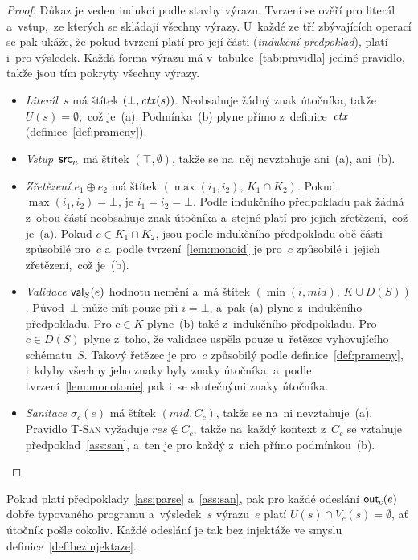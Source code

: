 \begin{proof}
Důkaz je veden indukcí podle stavby výrazu. Tvrzení se ověří pro literál a~vstup,~ze kterých se skládají všechny výrazy. U~každé ze tří zbývajících operací se pak ukáže, že pokud tvrzení platí pro její části (\emph{indukční předpoklad}), platí i~pro výsledek. Každá forma výrazu má v~tabulce~\ref{tab:pravidla} jediné pravidlo, takže jsou tím pokryty všechny výrazy.
\begin{itemize}
    \item \emph{Literál~$s$} má štítek $(\bot, \mathit{ctx}(s))$. Neobsahuje žádný znak útočníka, takže $U(s) = \emptyset$,~což je~(a). Podmínka~(b) plyne přímo z~definice~$\mathit{ctx}$ (definice~\ref{def:prameny}).
    \item \emph{Vstup~$\mathsf{src}_n$} má štítek $(\top, \emptyset)$, takže se na~něj nevztahuje ani~(a), ani~(b).
    \item \emph{Zřetězení $e_1 \oplus e_2$} má štítek $(\max(i_1,i_2),\, K_1 \cap K_2)$. Pokud $\max(i_1,i_2) = \bot$, je $i_1 = i_2 = \bot$. Podle indukčního předpokladu pak žádná z~obou částí neobsahuje znak útočníka a~stejné platí pro jejich zřetězení,~což je~(a). Pokud $c \in K_1 \cap K_2$, jsou podle indukčního předpokladu obě části způsobilé pro~$c$ a~podle tvrzení~\ref{lem:monoid} je pro~$c$ způsobilé i~jejich zřetězení,~což je~(b).
    \item \emph{Validace $\mathsf{val}_S(e)$} hodnotu nemění a~má štítek $(\min(i,\mathit{mid}),\, K \cup D(S))$. Původ~$\bot$ může mít pouze při $i = \bot$, a~pak (a) plyne z~indukčního předpokladu. Pro $c \in K$ plyne~(b) také z~indukčního předpokladu. Pro $c \in D(S)$ plyne z~toho, že validace uspěla pouze u~řetězce vyhovujícího schématu~$S$. Takový řetězec je pro~$c$ způsobilý podle definice~\ref{def:prameny}, i~kdyby všechny jeho znaky byly znaky útočníka, a~podle tvrzení~\ref{lem:monotonie} pak i~se skutečnými znaky útočníka.
    \item \emph{Sanitace $\sigma_c(e)$} má štítek $(\mathit{mid}, C_c)$, takže se na~ni nevztahuje~(a). Pravidlo \mbox{\textsc{T-San}} vyžaduje $\mathit{res} \notin C_c$, takže na~každý kontext z~$C_c$ se vztahuje předpoklad~\ref{ass:san}, a~ten je pro každý z~nich přímo podmínkou~(b).\qedhere
\end{itemize}
\end{proof}

\begin{veta}[Konfinace]
\label{thm:konfinace}
Pokud platí předpoklady~\ref{ass:parse} a~\ref{ass:san}, pak pro každé odeslání $\mathsf{out}_c(e)$ dobře typovaného programu a~výsledek~$s$ výrazu~$e$ platí $U(s) \cap V_c(s) = \emptyset$, ať útočník pošle cokoliv. Každé odeslání je tak bez injektáže ve smyslu definice~\ref{def:bezinjektaze}.
\end{veta}

